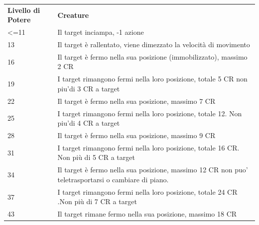 \documentclass[a4paper,11pt,twoside,openany]{book}
\begin{document}
\bigskip

\begin{tabularx}{0.95\textwidth}{lX}
	\toprule
	\textbf{Livello di Potere} & \textbf{Creature}\\
	\textless=11   & Il target inciampa, -1 azione\\
	13       & Il target è rallentato, viene dimezzato la velocità di movimento\\
	16       & Il target è fermo nella sua posizione (immobilizzato), massimo 2	CR\\
	19       & I target rimangono fermi nella loro posizione, totale 5 CR non piu'di 3 CR a target\\
	22       & Il target è fermo nella sua posizione, massimo 7 CR\\
	25       & I target rimangono fermi nella loro posizione, totale 12. Non piu'di 4 CR a target\\
	28      & Il target è fermo nella sua posizione, massimo 9 CR\\
	31      & I target rimangono fermi nella loro posizione, totale 16 CR. Non più di 5 CR a target\\
	34       & Il target è fermo nella sua posizione, massimo 12 CR non puo' teletrasportarsi o cambiare di piano.\\
	37       & I target rimangono fermi nella loro posizione, totale 24 CR .Non più di 7 CR a target\\
	43      & Il target rimane fermo nella sua posizione, massimo 18 CR\\
\end{tabularx}
\end{document}
